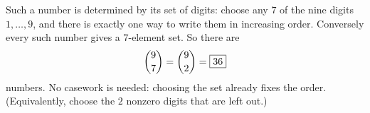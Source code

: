 Such a number is determined by its set of digits: choose any $7$ of the nine digits $1,\dots,9$, and there is exactly one way to write them in increasing order. Conversely every such number gives a $7$-element set. So there are
\[
\dbinom97=\dbinom92=\boxed{36}
\]
numbers. No casework is needed: choosing the set already fixes the order. (Equivalently, choose the $2$ nonzero digits that are left out.)
